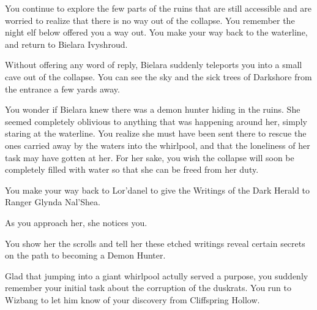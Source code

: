 
You continue to explore the few parts of the ruins that are still accessible and are worried to realize that there is no way out of the collapse. You remember the night elf below offered you a way out. You make your way back to the waterline, and return to Bielara Ivyshroud.


Without offering any word of reply, Bielara suddenly teleports you into a small cave out of the collapse. You can see the sky and the sick trees of Darkshore from the entrance a few yards away.

You wonder if Bielara knew there was a demon hunter hiding in the ruins. She seemed completely oblivious to anything that was happening around her, simply staring at the waterline. You realize she must have been sent there to rescue the ones carried away by the waters into the whirlpool, and that the loneliness of her task may have gotten at her. For her sake, you wish the collapse will soon be completely filled with water so that she can be freed from her duty.

You make your way back to Lor'danel to give the Writings of the Dark Herald to Ranger Glynda Nal'Shea.

As you approach her, she notices you.


You show her the scrolls and tell her these etched writings reveal certain secrets on the path to becoming a Demon Hunter.


Glad that jumping into a giant whirlpool actully served a purpose, you suddenly remember your initial task about the corruption of the duskrats. You run to Wizbang to let him know of your discovery from Cliffspring Hollow.
